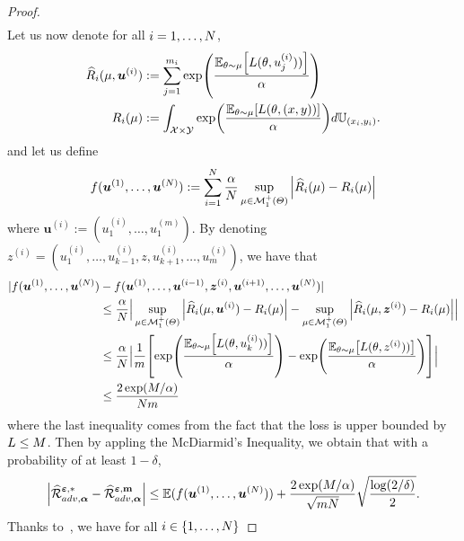 \begin{proof}
\begin{align*}
\end{align*}
Let us now denote for all $i=1,\dots,N$,
\begin{align*}
    \widehat{R}_i(\mu,\bm{u}^{(i)})&:=\sum_{j=1}^{m_i}\exp\left(\frac{\mathbb{E}_{\theta \sim \mu}\left[\loss(\theta,u_j^{(i)}))\right]}{\alpha}\right)\\
    R_i(\mu)&:= \int_{\mathcal{X}\times\mathcal{Y}}\exp\left(\frac{\mathbb{E}_{\theta \sim \mu}\left[\loss(\theta,(x,y))\right]}{\alpha}\right) d\mathbb{U}_{(x_i,y_i)}.
\end{align*}
and let us define 
\begin{align*}
    f(\bm{u}^{(1)},\dots,\bm{u}^{(N)}):=\sum_{i=1}^N\frac{\alpha}{N}\sup_{\mu\in \mathcal{M}^+_1(\Theta)}\Big |\widehat{R}_i(\mu) -R_i(\mu)\Big |
\end{align*}
where $\bm{u}^{(i)}:=(u_1^{(i)},\dots,u_1^{(m)})$. By denoting $z^{(i)}=(u_1^{(i)},\dots,u_{k-1}^{(i)},z,u_{k+1}^{(i)},\dots,u_m^{(i)})$, we have that
\begin{align*}
  |f(\bm{u}^{(1)},\dots,\bm{u}^{(\numsamples)})& - f(\bm{u}^{(1)},\dots,\bm{u}^{(i-1)},\bm{z}^{(i)},\bm{u}^{(i+1)},\dots,\bm{u}^{(\numsamples)})|\\
  &\leq \frac{\alpha}{\numsamples}\Big | \sup_{\mu\in \mathcal{M}^+_1(\Theta)}\Big |\widehat{R}_i(\mu,\bm{u}^{(i)}) -R_i(\mu)\Big |
  - \sup_{\mu\in \mathcal{M}^+_1(\Theta)}\Big |\widehat{R}_i(\mu,\bm{z}^{(i)}) -R_i(\mu)\Big | \Big |\\
  &\leq \frac{\alpha}{\numsamples}\Big |\frac{1}{m}\left[\exp\left(\frac{\mathbb{E}_{\theta \sim \mu}\left[\loss(\theta,u_k^{(i)}))\right]}{\alpha}\right) - \exp\left(\frac{\mathbb{E}_{\theta \sim \mu}\left[\loss(\theta,z^{(i)}))\right]}{\alpha}\right) \right]\Big| \\
  &\leq \frac{2\exp(M/\alpha)}{\numsamples m}
\end{align*}
where the last inequality comes from the fact that the loss is upper bounded by $L\leq M$. Then by appling the McDiarmid’s Inequality, we obtain that with a probability of at least $1-\delta$,
\begin{align*}
 \Big| \widehat{\mathcal{R}}^{\bm{\varepsilon},*}_{adv,\bm{\alpha}} - \widehat{\mathcal{R}}^{\bm{\varepsilon},\textbf{m}}_{adv,\bm{\alpha}}\Big |\leq\mathbb{E}(f(\bm{u}^{(1)},\dots,\bm{u}^{(N)}))+\frac{2\exp(M/\alpha)}{\sqrt{mN}}\sqrt{\frac{\log(2/\delta)}{2}}.
\end{align*}
Thanks to~\citep[Lemma 26.2]{shalev2014understanding}, we have for all $i\in\{1,\dots,N\}$

\end{proof}
